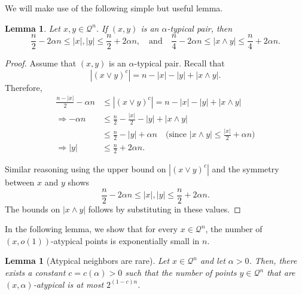 \documentclass[11pt]{article}
\theoremstyle{definition}
\theoremstyle{plain}
\newtheorem{lemma}[definition]{Lemma}
\begin{document}
We will make use of the following simple but useful lemma.

\begin{lemma} \label{lem: alpha typical pair}
Let $x, y \in \mathcal{Q}^n$. If $(x, y)$ is an $\alpha$-typical pair, then
\[
\frac{n}{2} - 2\alpha n \leq |x|, |y| \leq \frac{n}{2} + 2\alpha n, \quad \text{and} \quad \frac{n}{4} - 2\alpha n \leq |x \land y| \leq \frac{n}{4} + 2\alpha n.
\]

\end{lemma}

\begin{proof}
Assume that $(x, y)$ is an $\alpha$-typical pair. 
Recall that
\[
|(x \lor y)^c| = n - |x| - |y| + |x \land y|.
\]
Therefore, 
\begin{align*}
\frac{n - |x|}{2} - \alpha n &\leq  |(x \lor y)^c| = n - |x| - |y| + |x \land y| \\
\Rightarrow -\alpha n &\leq \frac{n}{2} - \frac{|x|}{2} - |y| + |x \land y| \\
&\leq \frac{n}{2} - |y| + \alpha n \quad \text{(since $|x \land y| \leq \frac{|x|}{2} + \alpha n$)} \\
\Rightarrow |y| &\leq \frac{n}{2} + 2\alpha n.
\end{align*}

Similar reasoning using the upper bound on $|(x \lor y)^c|$ and the symmetry between $x$ and $y$ shows
\[
\frac{n}{2} - 2\alpha n \leq |x|, |y| \leq \frac{n}{2} + 2\alpha n.
\]
The bounds on $|x \land y|$ follows by substituting in these values.
\end{proof}


In the following lemma, we show that for every \( x \in \mathcal{Q}^n \), the number of \((x, o(1))\)-atypical points is exponentially small in \( n \).


\begin{lemma}[Atypical neighbors are rare]\label{lem: atypical-pairs}
Let \( x \in \mathcal{Q}^n \) and let \( \alpha > 0 \). Then, there exists a constant \( c = c(\alpha) > 0 \) such that the number of points \( y \in \mathcal{Q}^n \) that are \((x, \alpha)\)-atypical is at most \( 2^{(1 - c)n} \).
\end{lemma}
\end{document}
